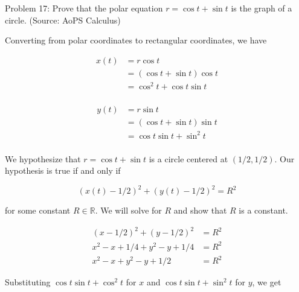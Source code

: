 Problem 17: Prove that the polar equation $r = \cos t + \sin t$ is the graph of a circle. (Source: AoPS Calculus)

Converting from polar coordinates to rectangular coordinates, we have

\begin{align*}
x(t) &= r \cos t \\
&= (\cos t + \sin t) \cos t \\
&= \cos^2 t + \cos t \sin t \\
\end{align*}

\begin{align*}
y(t) &= r \sin t \\
&= (\cos t + \sin t) \sin t \\
&= \cos t \sin t + \sin^2 t \\
\end{align*}

We hypothesize that $r = \cos t + \sin t$ is a circle centered at $(1/2, 1/2)$. Our hypothesis is true if and only if

$$ (x(t) - 1/2)^2 + (y(t) - 1/2)^2 = R^2 $$

for some constant $R \in \mathbb{R}$. We will solve for $R$ and show that $R$ is a constant.

\begin{align*}
(x - 1/2)^2 + (y - 1/2)^2 &= R^2 \\
x^2 - x + 1/4 + y^2 - y + 1/4 &= R^2 \\
x^2 - x + y^2 - y + 1/2 &= R^2
\end{align*}

Substituting $\cos t \sin t + \cos^2 t$ for $x$ and $\cos t \sin t + \sin^2 t$ for $y$, we get


